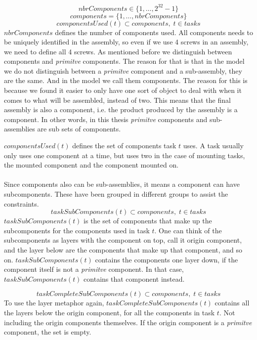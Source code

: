  \begin{equation}\label{eq:6}
 nbrComponents \in \{1 , \ldots , 2^{32}-1\}
 \end{equation}
 \begin{equation}\label{eq:13}
 components = \{1 , \ldots , nbrComponents\}
 \end{equation}
 \begin{equation}\label{eq:25}
 componentsUsed(t) \subset components, \; t \in tasks
 \end{equation}
 $nbrComponents$ defines the number of components used. All components needs to be uniquely identified in the assembly, so even if we use 4 screws in an assembly, we need to define all 4 screws. As mentioned before we distinguish between components and \emph{primitve} components. The reason for that is that in the model we do not distinguish between a \emph{primitve} component and a sub-assembly, they are the same. And in the model we call them components. The reason for this is because we found it easier to only have one sort of object to deal with when it comes to what will be assembled, instead of two. This means that the final assembly is also a component, i.e. the product produced by the assembly is a component. In other words, in this thesis \emph{primitve} components and sub-assemblies are sub sets of components.
 
 $componentsUsed(t)$ defines the set of components task $t$ uses. A task usually only uses one component at a time, but uses two in the case of mounting tasks, the mounted component and the component mounted on.
 \\\\
 Since components also can be sub-assemblies, it means a component can have subcomponents. These have been grouped in different groups to assist the constraints.
 \begin{equation}\label{eq:53}
 taskSubComponents(t) \subset components, \; t \in tasks\end{equation}
 $taskSubComponents(t)$ is the set of components that make up the subcomponents for the components used in task $t$. One can think of the subcomponents as layers with the component on top, call it origin component, and the layer below are the components that make up that component, and so on. $taskSubComponents(t)$ contains the components one layer down, if the component itself is not a \emph{primitve} component. In that case, $taskSubComponents(t)$ contains that component instead.
 
 \begin{equation}\label{eq:54}
 taskCompleteSubComponents(t) \subset components, \; t \in tasks\end{equation}
 To use the layer metaphor again, $taskCompleteSubComponents(t)$ contains all the layers below the origin component, for all the components in task $t$. Not including the origin components themselves. If the origin component is a \emph{primitve} component, the set is empty.
 
